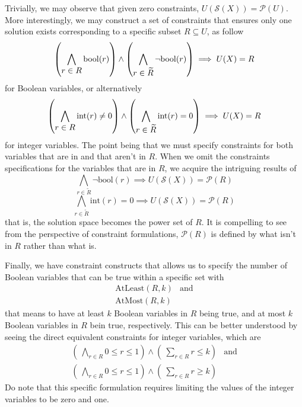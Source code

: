 \documentclass{article}
\newcommand{\combine}[7]{#1 #2 \vphantom{#6} #3 #4 #5 #6 \vphantom{#2} #7}
\begin{document}
Trivially, we may observe that given zero constraints, \(U(\mathcal{S}(X)) = \mathcal{P}(U)\). More interestingly, we may construct a set of constraints that ensures only one solution exists corresponding to a specific subset \(R \subseteq U\), as follow
\[
	\combine{\left(}{\bigwedge \limits_{\displaystyle r \in R} \mathrm{bool}(r)}{\right)}{\wedge}{\left(}{\bigwedge \limits_{\displaystyle r \in \widetilde{R}} \neg \mathrm{bool}(r)}{\right)} \implies U(X) = R
\]
for Boolean variables, or alternatively
\[
	\combine{\left(}{\bigwedge \limits_{\displaystyle r \in R} \mathrm{int}(r) \neq 0}{\right)}{\wedge}{\left(}{\bigwedge \limits_{\displaystyle r \in \widetilde{R}} \mathrm{int}(r) = 0}{\right)} \implies U(X) = R
\]
for integer variables. The point being that we must specify constraints for both variables that are in and that aren't in \(R\). When we omit the constraints specifications for the variables that are in \(R\), we acquire the intriguing results of
\[
	\bigwedge \limits_{\displaystyle r \in \widetilde{R}} \neg \mathrm{bool}(r) \implies U(\mathcal{S}(X)) = \mathcal{P}(R)
\]
\[
	\bigwedge \limits_{\displaystyle r \in \widetilde{R}} \mathrm{int}(r) = 0 \implies U(\mathcal{S}(X)) = \mathcal{P}(R)
\]
that is, the solution space becomes the power set of \(R\). It is compelling to see from the perspective of constraint formulations, \(\mathcal{P}(R)\) is defined by what isn't in \(R\) rather than what is.

Finally, we have constraint constructs that allows us to specify the number of Boolean variables that can be true within a specific set with
\[
\begin{array}{ll}
	\mathrm{AtLeast}(R, k) & \text{and} \\ [4pt]
	\mathrm{AtMost}(R, k)
\end{array}
\]
that means to have at least \(k\) Boolean variables in \(R\) being true, and at most \(k\) Boolean variables in \(R\) bein true, respectively. This can be better understood by seeing the direct equivalent constraints for integer variables, which are
\[
\begin{array}{ll}
	\displaystyle \left( \ \bigwedge \limits_{\displaystyle r \in R} 0 \leq r \leq 1 \right) \wedge \left( \ \sum \limits_{\displaystyle r \in R} r \leq k \right) & \text{and} \\ [18pt]
	\displaystyle \left( \ \bigwedge \limits_{\displaystyle r \in R} 0 \leq r \leq 1 \right) \wedge \left( \ \sum \limits_{\displaystyle r \in R} r \geq k \right)
\end{array}
\]
Do note that this specific formulation requires limiting the values of the integer variables to be zero and one.
\end{document}
